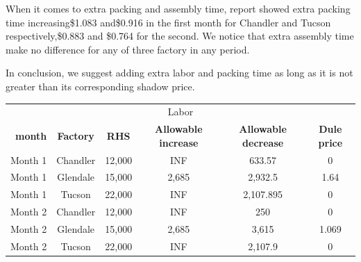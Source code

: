 \documentclass[12pt]{article}
\begin{document}
\begin{itemize}
		\par
		When it comes to extra packing and assembly time, report showed extra packing time increasing\$1.083 and\$0.916 in the first month for Chandler and Tucson respectively,\$0.883 and \$0.764 for the second. We notice that extra assembly time make no difference for any of three factory in any period.
		\par
		In conclusion, we suggest adding extra labor and packing time as long as it is not greater than its corresponding shadow price.
		\par
	
	
\begin{center}
\begin{tabular}{c c c c c c }
\hline
\multicolumn{6}{c}{Labor} \\
\ \textbf{month} &\textbf{Factory} &\textbf{RHS} & \textbf{Allowable increase} & \textbf{Allowable decrease} &  \textbf{Dule price}\\
\hline
Month 1     &Chandler  &12,000    &INF   &633.57    &0\\
Month 1     &Glendale  &15,000    &2,685 &2,932.5   &1.64\\
Month 1     &Tucson    &22,000    &INF   &2,107.895 &0\\
Month 2     &Chandler  &12,000    &INF   &250       &0\\
Month 2     &Glendale  &15,000    &2,685 &3,615     &1.069\\
Month 2     &Tucson    &22,000    &INF   &2,107.9   &0\\
\hline
\end{tabular}
\end{center}


\end{itemize}
\end{document}
